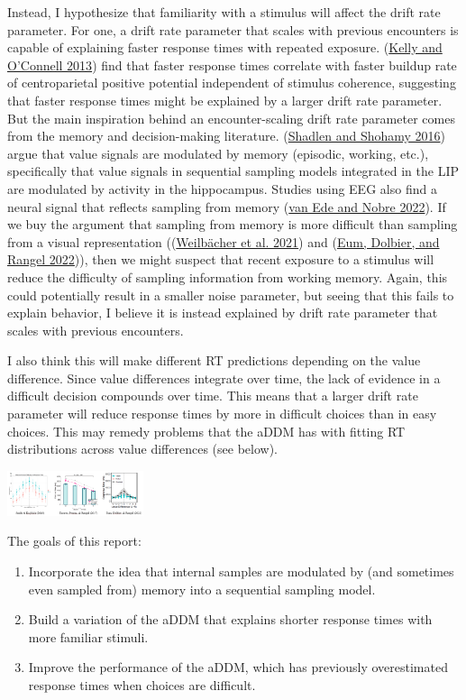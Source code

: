 \documentclass[
]{book}
\providecommand{\tightlist}{%
  \setlength{\itemsep}{0pt}\setlength{\parskip}{0pt}}
\begin{document}
Instead, I hypothesize that familiarity with a stimulus will affect the drift rate parameter. For one, a drift rate parameter that scales with previous encounters is capable of explaining faster response times with repeated exposure. (\protect\hyperlink{ref-kelly2013}{Kelly and O'Connell 2013}) find that faster response times correlate with faster buildup rate of centroparietal positive potential independent of stimulus coherence, suggesting that faster response times might be explained by a larger drift rate parameter. But the main inspiration behind an encounter-scaling drift rate parameter comes from the memory and decision-making literature. (\protect\hyperlink{ref-shadlen2016}{Shadlen and Shohamy 2016}) argue that value signals are modulated by memory (episodic, working, etc.), specifically that value signals in sequential sampling models integrated in the LIP are modulated by activity in the hippocampus. Studies using EEG also find a neural signal that reflects sampling from memory (\protect\hyperlink{ref-vanede2022}{van Ede and Nobre 2022}). If we buy the argument that sampling from memory is more difficult than sampling from a visual representation ((\protect\hyperlink{ref-weilbacher2021}{Weilbächer et al. 2021}) and (\protect\hyperlink{ref-eum2022}{Eum, Dolbier, and Rangel 2022})), then we might suspect that recent exposure to a stimulus will reduce the difficulty of sampling information from working memory. Again, this could potentially result in a smaller noise parameter, but seeing that this fails to explain behavior, I believe it is instead explained by drift rate parameter that scales with previous encounters.

I also think this will make different RT predictions depending on the value difference. Since value differences integrate over time, the lack of evidence in a difficult decision compounds over time. This means that a larger drift rate parameter will reduce response times by more in difficult choices than in easy choices. This may remedy problems that the aDDM has with fitting RT distributions across value differences (see below).

\includegraphics[width=0.3\textwidth,height=\textheight]{images/mem-aDDM-aDDM_rt_pred.PNG}

The goals of this report:

\begin{enumerate}
\def\labelenumi{\arabic{enumi}.}
\tightlist
\item
  Incorporate the idea that internal samples are modulated by (and sometimes even sampled from) memory into a sequential sampling model.
\item
  Build a variation of the aDDM that explains shorter response times with more familiar stimuli.
\item
  Improve the performance of the aDDM, which has previously overestimated response times when choices are difficult.
\end{enumerate}
\end{document}
